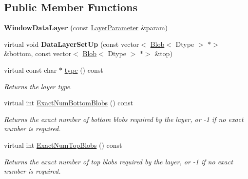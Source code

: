 \subsection*{Public Member Functions}
\begin{DoxyCompactItemize}
\item 
\mbox{\label{classcaffe_1_1_window_data_layer_a747fce6a6cfc2bcc05f9422d8b1cba97}} 
{\bfseries Window\+Data\+Layer} (const \mbox{\hyperlink{classcaffe_1_1_layer_parameter}{Layer\+Parameter}} \&param)
\item 
\mbox{\label{classcaffe_1_1_window_data_layer_a217f2006728530d6c53d273c6ea0c0c0}} 
virtual void {\bfseries Data\+Layer\+Set\+Up} (const vector$<$ \mbox{\hyperlink{classcaffe_1_1_blob}{Blob}}$<$ Dtype $>$ $\ast$$>$ \&bottom, const vector$<$ \mbox{\hyperlink{classcaffe_1_1_blob}{Blob}}$<$ Dtype $>$ $\ast$$>$ \&top)
\item 
\mbox{\label{classcaffe_1_1_window_data_layer_abbe9d7bd1141bf0492eeca4bb1d7b7c3}} 
virtual const char $\ast$ \mbox{\hyperlink{classcaffe_1_1_window_data_layer_abbe9d7bd1141bf0492eeca4bb1d7b7c3}{type}} () const
\begin{DoxyCompactList}\small\item\em Returns the layer type. \end{DoxyCompactList}\item 
virtual int \mbox{\hyperlink{classcaffe_1_1_window_data_layer_ac982c8170a7f899366321412a7bb91d7}{Exact\+Num\+Bottom\+Blobs}} () const
\begin{DoxyCompactList}\small\item\em Returns the exact number of bottom blobs required by the layer, or -\/1 if no exact number is required. \end{DoxyCompactList}\item 
virtual int \mbox{\hyperlink{classcaffe_1_1_window_data_layer_a7bd9264758f462b3392d2eedec8b1c99}{Exact\+Num\+Top\+Blobs}} () const
\begin{DoxyCompactList}\small\item\em Returns the exact number of top blobs required by the layer, or -\/1 if no exact number is required. \end{DoxyCompactList}\item 
\mbox{\label{classcaffe_1_1_window_data_layer_a747fce6a6cfc2bcc05f9422d8b1cba97}} 

\end{DoxyCompactItemize}
